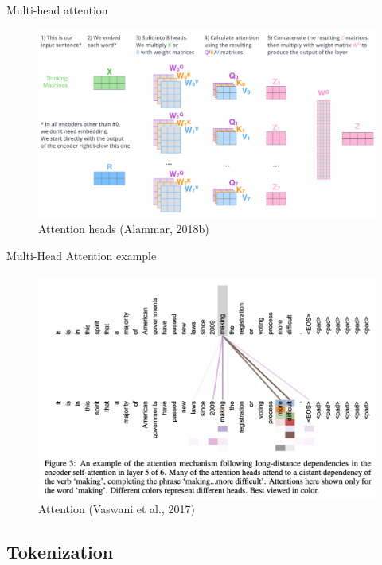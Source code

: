 \documentclass[10pt]{beamer}
\begin{document}
\begin{frame}{Multi-head attention}

\begin{figure}[h]
\centering
\includegraphics[width=1\textwidth]{fig/alammar_transformer_multi-headed_self-attention-recap.png}
\caption{Attention heads (Alammar, 2018b)}
\end{figure}

\end{frame}


\begin{frame}{Multi-Head Attention example}

\begin{figure}[h]
\centering
\includegraphics[width=1\textwidth]{fig/Vaswani_3_attention.png}
\caption{Attention (Vaswani et al., 2017)}
\end{figure}

\end{frame}

\subsection{Tokenization}
\end{document}
